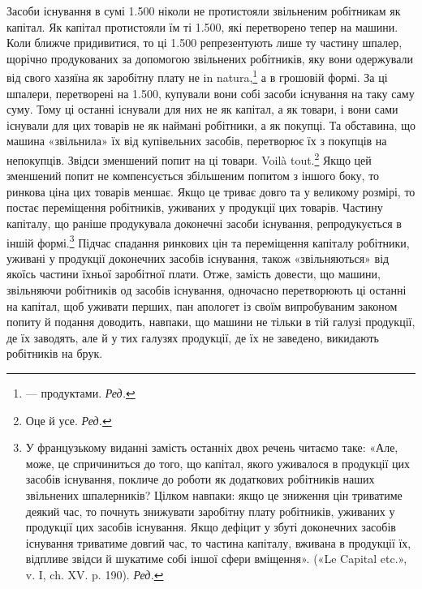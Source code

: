 Засоби існування в сумі 1.500 ніколи не протистояли
звільненим робітникам як капітал. Як капітал протистояли
їм ті 1.500, які перетворено тепер на
машини. Коли ближче придивитися, то ці 1.500
репрезентують лише ту частину шпалер, щорічно продукованих
за допомогою звільнених робітників, яку вони одержували
від свого хазяїна як заробітну плату не in natura,\footnote*{
— продуктами. \emph{Ред.}
} а в грошовій
формі. За ці шпалери, перетворені на 1.500,
купували вони собі засоби існування на таку саму суму. Тому ці
останні існували для них не як капітал, а як товари, і вони сами
існували для цих товарів не як наймані робітники, а як покупці.
Та обставина, що машина «звільнила» їх від купівельних засобів,
перетворює їх з покупців на непокупців. Звідси зменшений
попит на ці товари. Voilà tout.\footnote*{
Оце й усе. \emph{Ред.}
} Якщо цей зменшений попит не
компенсується збільшеним попитом з іншого боку, то ринкова
ціна цих товарів меншає. Якщо це триває довго та у великому
розмірі, то постає переміщення робітників, уживаних у продукції
цих товарів. Частину капіталу, що раніше продукувала доконечні
засоби існування, репродукується в іншій формі.\footnote*{
У французькому виданні замість останніх двох речень читаємо
таке: «Але, може, це спричиниться до того, що капітал, якого уживалося
в продукції цих засобів існування, покличе до роботи як додаткових
робітників наших звільнених шпалерників? Цілком навпаки: якщо це
зниження цін триватиме деякий час, то почнуть знижувати заробітну плату
робітників, уживаних у продукції цих засобів існування. Якщо дефіцит
у збуті доконечних засобів існування триватиме довгий час, то частина
капіталу, вживана в продукції їх, відпливе звідси й шукатиме собі іншої
сфери вміщення». («Le Capital etc.», v. I, ch. XV. p. 190). \emph{Ред.}
} Підчас спадання
ринкових цін та переміщення капіталу робітники, уживані
у продукції доконечних засобів існування, також «звільняються»
від якоїсь частини їхньої заробітної плати. Отже, замість
довести, що машини, звільняючи робітників од засобів існування,
одночасно перетворюють ці останні на капітал, щоб уживати
перших, пан апологет із своїм випробуваним законом попиту й
подання доводить, навпаки, що машини не тільки в тій галузі
продукції, де їх заводять, але й у тих галузях продукції, де їх
не заведено, викидають робітників на брук.

